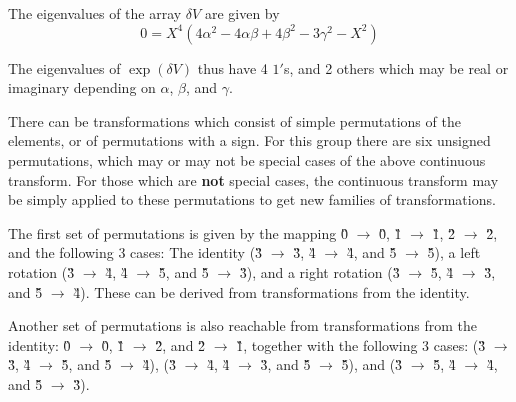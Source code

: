 \documentclass[12pt]{article}
\begin{document}

 The eigenvalues of the array $\delta V$ are given by
\begin{equation}
0 = X^4 \left( 4 \alpha^2 - 4\alpha\beta + 4\beta^2 - 3\gamma^2 - X^2 \right)
\end{equation}

 The eigenvalues of $\exp (\delta V)$ thus have 4 $1'$s, and 2 others which
may be real or imaginary depending on $\alpha$, $\beta$, and $\gamma$.

  There can be transformations which consist of simple permutations of the
elements, or of permutations with a sign.  For this group there are six
unsigned permutations, which may or may not be special cases of the above
continuous transform.  For those which are {\bf not} special cases, the
continuous transform may be simply applied to these permutations to get
new families of transformations.

  The first set of permutations is given by the mapping \G0 $\rightarrow$ \G0,
\G1 $\rightarrow$ \G1, \G2 $\rightarrow$ \G2, and the following 3 cases:  
The identity
(\G3 $\rightarrow$ \G3, \G4 $\rightarrow$ \G4, and \G5 $\rightarrow$ \G5), 
a left rotation
(\G3 $\rightarrow$ \G4, \G4 $\rightarrow$ \G5, and \G5 $\rightarrow$ \G3), 
and a right rotation
(\G3 $\rightarrow$ \G5, \G4 $\rightarrow$ \G3, and \G5 $\rightarrow$ \G4).  These
can be derived from transformations from the identity.

Another set of permutations is also reachable from transformations from the identity:
\G0 $\rightarrow$ \G0, \G1 $\rightarrow$ \G2, and \G2 $\rightarrow$ \G1, together
with the following 3 cases: (\G3 $\rightarrow$ \G3, \G4 $\rightarrow$ \G5,
and \G5 $\rightarrow$ \G4), (\G3 $\rightarrow$ \G4, \G4 $\rightarrow$ \G3,
and \G5 $\rightarrow$ \G5), and (\G3 $\rightarrow$ \G5, \G4 $\rightarrow$ \G4,
and \G5 $\rightarrow$ \G3).

\end{document}
